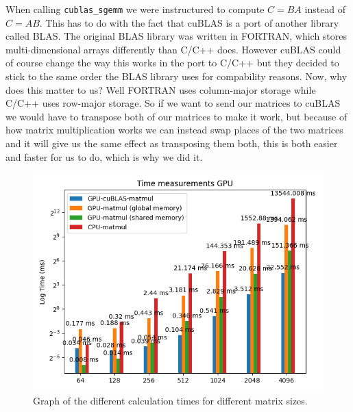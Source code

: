 \documentclass[a4paper, 12pt]{article}
\def\code#1{\texttt{#1}}
\begin{document}
When calling \code{cublas\_sgemm} we were instructured to compute $C=BA$ instead of $C=AB$. This has to do with the fact that cuBLAS is a port of another library called BLAS. The original BLAS library was written in FORTRAN, which stores multi-dimensional arrays differently than C/C++ does. However cuBLAS could of course change the way this works in the port to C/C++ but they decided to stick to the same order the BLAS library uses for compability reasons. Now, why does this matter to us? Well FORTRAN uses column-major storage while C/C++ uses row-major storage. So if we want to send our matrices to cuBLAS we would have to transpose both of our matrices to make it work, but because of how matrix multiplication works we can instead swap places of the two matrices and it will give us the same effect as transposing them both, this is both easier and faster for us to do, which is why we did it.



\begin{figure}
    \centering
    \includegraphics[width=0.8\linewidth]{images/blas_graph.png}
    \caption{Graph of the different calculation times for different matrix sizes.}
    \label{fig:blas_graph}
\end{figure}
\end{document}
